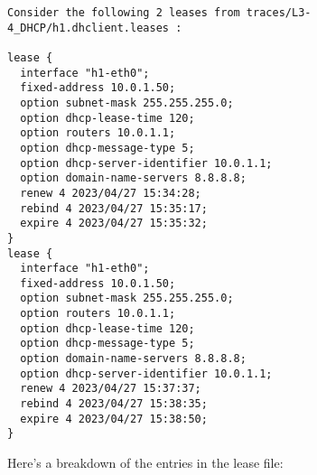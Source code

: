 \begin{verbatim}
Consider the following 2 leases from traces/L3-4_DHCP/h1.dhclient.leases :

lease {
  interface "h1-eth0";
  fixed-address 10.0.1.50;
  option subnet-mask 255.255.255.0;
  option dhcp-lease-time 120;
  option routers 10.0.1.1;
  option dhcp-message-type 5;
  option dhcp-server-identifier 10.0.1.1;
  option domain-name-servers 8.8.8.8;
  renew 4 2023/04/27 15:34:28;
  rebind 4 2023/04/27 15:35:17;
  expire 4 2023/04/27 15:35:32;
}
lease {
  interface "h1-eth0";
  fixed-address 10.0.1.50;
  option subnet-mask 255.255.255.0;
  option routers 10.0.1.1;
  option dhcp-lease-time 120;
  option dhcp-message-type 5;
  option domain-name-servers 8.8.8.8;
  option dhcp-server-identifier 10.0.1.1;
  renew 4 2023/04/27 15:37:37;
  rebind 4 2023/04/27 15:38:35;
  expire 4 2023/04/27 15:38:50;
}
\end{verbatim}

Here's a breakdown of the entries in the lease file:

